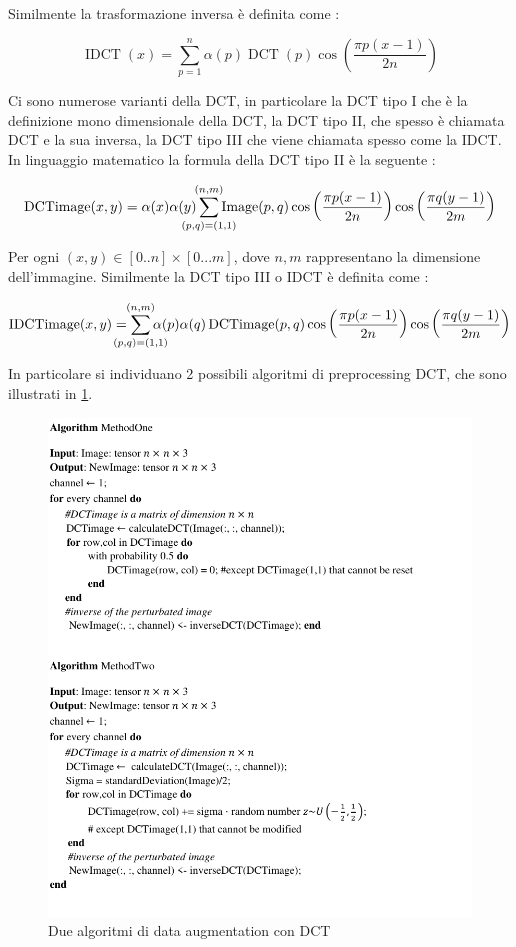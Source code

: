 Similmente la trasformazione inversa è definita come \cite{syed_dct}:

\[\operatorname{IDCT}(x)=\sum^{n}_{p=1} \alpha(p)\operatorname{DCT}(p) \cos \left(\frac { \pi p  (x- 1) } { 2 n }\right)\]


Ci sono numerose varianti della DCT, in particolare la DCT tipo I che è la definizione mono dimensionale della DCT, la DCT tipo II, che spesso è chiamata DCT e la sua inversa, la DCT tipo III che viene chiamata spesso come la IDCT. In linguaggio matematico la formula della DCT tipo II è la seguente \cite{syed_dct} \cite{gonzalez_dip} \cite{nanni_dct_pca}:


\[\operatorname{DCTimage} ( x , y ) = \alpha( x ) \alpha (y) \sum _ { \mathclap{(p , q) = (1,1)} } ^ { \mathclap{(n,m)} }  \operatorname { Image } ( p , q ) \cos \left(\frac { \pi p  (x-1) } { 2 n }  \right) \cos \left(\frac { \pi q  (y-1) } { 2 m }  \right) \]

Per ogni \((x,y) \in [0..n]\times [0...m]\), dove \(n,m\) rappresentano la dimensione dell'immagine. Similmente la DCT tipo III o IDCT è definita come \cite{syed_dct} \cite{gonzalez_dip}:

\[\operatorname{IDCTimage} ( x , y ) = \sum _ { \mathclap{(p , q) = (1,1) }} ^ {  \mathclap{(n,m) }} \alpha( p ) \alpha (q) \operatorname { DCTimage } ( p , q ) \cos \left(\frac {  \pi p  (x-1) } { 2 n }  \right) \cos \left(\frac { \pi q  (y-1) } { 2 m }  \right) \]

In particolare si individuano 2 possibili algoritmi di preprocessing DCT, che sono illustrati in \cref{fig:dct-algoritmi}.
\begin{figure}[ht]
    \centering
    \includegraphics[width=1\textwidth]{addestramento-rete-neurale/Algorithm-MethodDCT.pdf}
    \caption{Due algoritmi di data augmentation con DCT}
    \label{fig:dct-algoritmi}
\end{figure}
